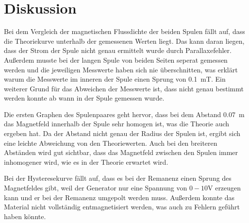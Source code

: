 \section{Diskussion}

Bei dem Vergleich der magnetischen Flussdichte der beiden Spulen fällt auf, dass
die Theoriekurve unterhalb der gemessenen Werten liegt. Das kann daran liegen, dass
der Strom der Spule nicht genau ermittelt wurde durch Parallaxefehler. Außerdem
musste bei der langen Spule von beiden Seiten seperat gemessen werden und die jeweiligen
Messwerte haben sich nie überschnitten, was erklärt warum die Messwerte im inneren
der Spule einen Sprung von \SI{0.1}{\milli\tesla}. Ein weiterer Grund für das Abweichen der
Messwerte ist, dass nicht genau bestimmt werden konnte ab wann in der Spule gemessen wurde.

Die ersten Graphen des Spulenpaares geht hervor, dass bei dem Abstand \SI{0.07}{\meter}
das Magnetfeld innerhalb der Spule sehr homogen ist, was die Theorie auch ergeben hat.
Da der Abstand nicht genau der Radius der Spulen ist, ergibt sich eine leichte Abweichung
von den Theoriewerten. Auch bei den breiteren Abständen wird gut sichtbar, dass
das Magnetfeld zwischen den Spulen immer inhomogener wird, wie es in der Theorie
erwartet wird.

Bei der Hysteresekurve fällt auf, dass es bei der Remanenz einen Sprung des Magnetfeldes
gibt, weil der Generator nur eine Spannung von $0-10\si{\volt}$ erzeugen kann und
er bei der Remanenz umgepolt werden muss. Außerdem konnte das Material nicht vollständig
entmagnetisiert werden, was auch zu Fehlern geführt haben könnte.
